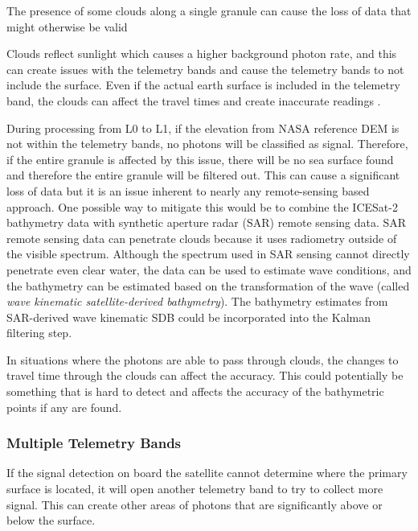 The presence of some clouds along a single granule can cause the loss of data that might otherwise be valid

Clouds reflect sunlight which causes a higher background photon rate, and this can create issues with the telemetry bands and cause the telemetry bands to not include the surface. Even if the actual earth surface is included in the telemetry band, the clouds can affect the travel times and create inaccurate readings \parencite{atl03knownissues}.

During processing from L0 to L1, if the elevation from NASA reference DEM is not within the telemetry bands, no photons will be classified as signal. Therefore, if the entire granule is affected by this issue, there will be no sea surface found and therefore the entire granule will be filtered out. This can cause a significant loss of data but it is an issue inherent to nearly any remote-sensing based approach. One possible way to mitigate this would be to combine the ICESat-2 bathymetry data with synthetic aperture radar (SAR) remote sensing data. SAR remote sensing data can penetrate clouds because it uses radiometry outside of the visible spectrum. Although the spectrum used in SAR sensing cannot directly penetrate even clear water, the data can be used to estimate wave conditions, and the bathymetry can be estimated based on the transformation of the wave (called \emph{wave kinematic satellite-derived bathymetry}). The bathymetry estimates from SAR-derived wave kinematic SDB could be incorporated into the Kalman filtering step. 

In situations where the photons are able to pass through clouds, the changes to travel time through the clouds can affect the accuracy. This could potentially be something that is hard to detect and affects the accuracy of the bathymetric points if any are found.
 

\subsubsection{Multiple Telemetry Bands}

If the signal detection on board the satellite cannot determine where the primary surface is located, it will open another telemetry band to try to collect more signal. This can create other areas of photons that are significantly above or below the surface.

